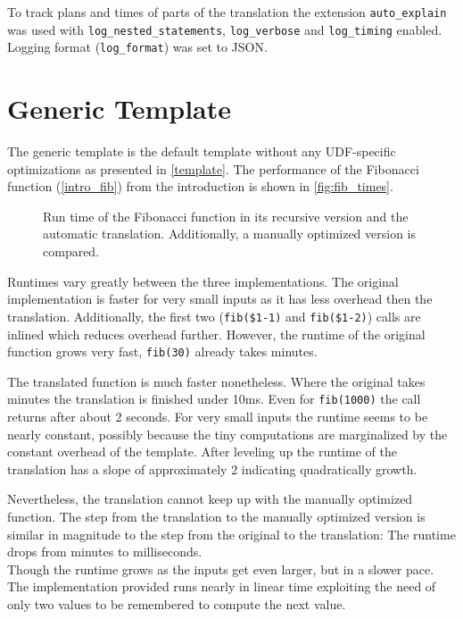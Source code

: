 To track plans and times of parts of the translation the extension \texttt{auto\_explain} was used with \texttt{log\_nested\_statements}, \texttt{log\_verbose} and \texttt{log\_timing} enabled. Logging format (\texttt{log\_format}) was set to JSON.

\section{Generic Template}

The generic template is the default template without any UDF-specific optimizations as presented in \autoref{template}. The performance of the Fibonacci function (\autoref{intro_fib}) from the introduction is shown in \autoref{fig:fib_times}.

\begin{figure}[h!]
    \centering\small
    
    \caption{Run time of the Fibonacci function in its recursive version and the automatic translation. Additionally, a manually optimized version is compared.}
    \label{fig:fib_times}
\end{figure}

Runtimes vary greatly between the three implementations. The original implementation is faster for very small inputs as it has less overhead then the translation. Additionally, the first two (\texttt{fib(\$1-1)} and \texttt{fib(\$1-2)}) calls are inlined which reduces overhead further. However, the runtime of the original function grows very fast, \texttt{fib(30)} already takes minutes.

The translated function is much faster nonetheless. Where the original takes minutes the translation is finished under 10ms. Even for \texttt{fib(1000)} the call returns after about 2 seconds. For very small inputs the runtime seems to be nearly constant, possibly because the tiny computations are marginalized by the constant overhead of the template. After leveling up the runtime of the translation has a slope of approximately 2 indicating quadratically growth.

Nevertheless, the translation cannot keep up with the manually optimized function. The step from the translation to the manually optimized version is similar in magnitude to the step from the original to the translation: The runtime drops from minutes to milliseconds.\\
Though the runtime grows as the inputs get even larger, but in a slower pace. The implementation provided runs nearly in linear time exploiting the need of only two values to be remembered to compute the next value.\\

